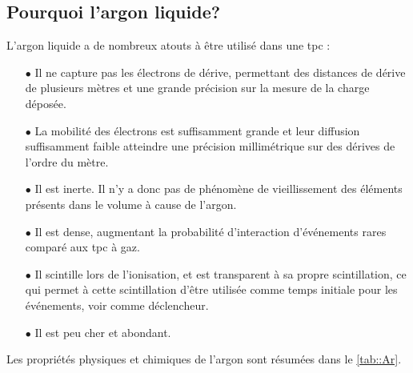     \subsection{Pourquoi l'argon liquide?}
      L'argon liquide a de nombreux atouts à être utilisé dans une \gls{tpc}\cite{Rubbia1977} :
      \begin{itemize}
        \item[$\bullet$] Il ne capture pas les électrons de dérive, permettant des distances de dérive de plusieurs mètres et une grande précision sur la mesure de la charge déposée.
        \item[$\bullet$] La mobilité des électrons est suffisamment grande et leur diffusion suffisamment faible atteindre une précision millimétrique sur des dérives de l'ordre du mètre.
        \item[$\bullet$] Il est inerte. Il n'y a donc pas de phénomène de vieillissement des éléments présents dans le volume à cause de l'argon.
        \item[$\bullet$] Il est dense, augmentant la probabilité d'interaction d'événements rares comparé aux \gls{tpc} à gaz.
        \item[$\bullet$] Il scintille lors de l'ionisation, et est transparent à sa propre scintillation, ce qui permet à cette scintillation d'être utilisée comme temps initiale pour les événements, voir comme déclencheur.
        \item[$\bullet$] Il est peu cher et abondant.
      \end{itemize}
      Les propriétés physiques et chimiques de l'argon sont résumées dans le \autoref{tab::Ar}.
